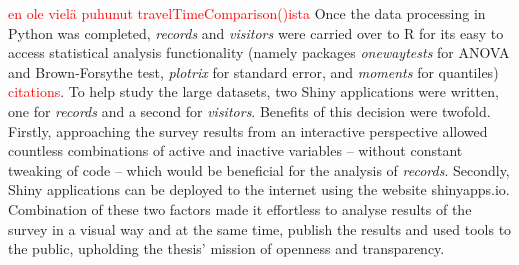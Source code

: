 \textcolor{red}{en ole vielä puhunut travelTimeComparison()ista}
Once the data processing in Python was completed, \textit{records} and \textit{visitors} were carried over to R for its easy to access statistical analysis functionality (namely packages \textit{onewaytests} for ANOVA and Brown-Forsythe test, \textit{plotrix} for standard error, and \textit{moments} for quantiles) \textcolor{red}{citations}. To help study the large datasets, two Shiny applications were written, one for \textit{records} and a second for \textit{visitors}. Benefits of this decision were twofold. Firstly, approaching the survey results from an interactive perspective allowed countless combinations of active and inactive variables -- without constant tweaking of code -- which would be beneficial for the analysis of \textit{records}. Secondly, Shiny applications can be deployed to the internet using the website shinyapps.io. Combination of these two factors made it effortless to analyse results of the survey in a visual way and at the same time, publish the results and used tools to the public, upholding the thesis' mission of openness and transparency.

